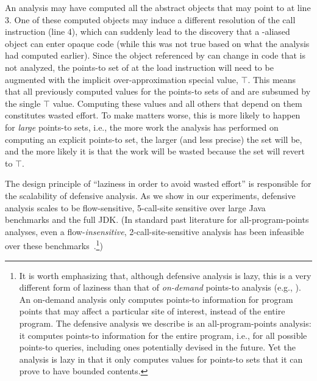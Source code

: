 An analysis may have computed all the abstract objects that
 may point to at line 3. One of these computed objects may
induce a different resolution of the call instruction (line 4), which
can suddenly lead to the discovery that a -aliased object
can enter opaque code (while this was not true based on what the
analysis had computed earlier). Since the object referenced by
 can change in code that is not analyzed, the points-to set
of  at the load instruction will need to be augmented with the
implicit over-approximation special value, $\top$.  This means that
all previously computed values for the points-to sets of  and
 are subsumed by the single $\top$ value. Computing these
values and all others that depend on them constitutes wasted
effort. To make matters worse, this is more likely to happen for
\emph{large} points-to sets, i.e., the more work the analysis has
performed on computing an explicit points-to set, the larger (and less
precise) the set will be, and the more likely it is that the work will
be wasted because the set will revert to $\top$.



The design principle of ``laziness in order to avoid wasted effort''
is responsible for the scalability of defensive analysis. As we show
in our experiments, defensive analysis scales to be flow-sensitive,
5-call-site sensitive over large Java benchmarks and the full JDK.
(In standard past literature for all-program-points analyses, even a
flow-\emph{insensitive}, 2-call-site-sensitive analysis has been
infeasible over these
benchmarks~\cite{Smaragdakis:2014:IAC:2594291.2594320}.\footnote{It is
  worth emphasizing that, although defensive analysis is lazy, this
  is a very different form of laziness than that of \emph{on-demand}
  points-to analysis (e.g.,
  \cite{DBLP:conf/ecoop/SpathDAB16,dvanhorn:biswas-popl97}). An
  on-demand analysis only computes points-to information for program
  points that may affect a particular site of interest, instead of the
  entire program. The defensive analysis we describe is an
  all-program-points analysis: it computes points-to information for
  the entire program, i.e., for all possible points-to queries,
  including ones potentially devised in the future. Yet the analysis is
  lazy in that it only computes values for points-to sets that it can
  prove to have bounded contents.})


